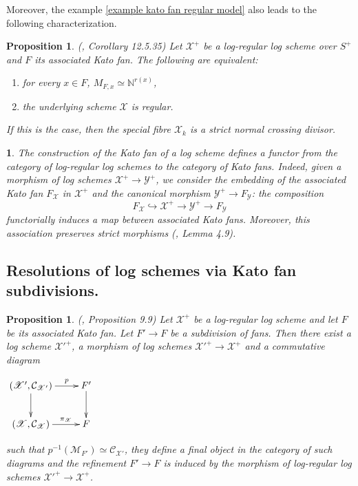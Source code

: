 \documentclass{amsart}%
\numberwithin{equation}{subsection}
\theoremstyle{plain2}
\newtheorem{prop}[equation]{Proposition}
\theoremstyle{definition2}
\theoremstyle{stepstyle}
\theoremstyle{point}
\theoremstyle{subpoint}
\newtheorem{subpoint}[equation]{}%
\newcommand{\spa}[1]{\begin{subpoint}#1\end{subpoint}}           %
\newcommand{\N}{\ensuremath{\mathbb{N}}}
\newcommand{\cX}{\ensuremath{\mathscr{X}}}
\newcommand{\caM}{\ensuremath{\mathcal{M}}}
\newcommand{\caC}{\ensuremath{\mathcal{C}}}
\newcommand{\cY}{\ensuremath{\mathscr{Y}}}
\renewcommand{\cY}{\ensuremath{\mathscr{Y}}}
\begin{document}
Moreover, the example \ref{example kato fan regular model} also leads to the following characterization.

\begin{prop} \label{resolution log scheme kato fan} (\cite{GabberRamero}, Corollary 12.5.35)
Let $\cX^+$ be a log-regular log scheme over $S^+$ and $F$ its associated Kato fan. The following are equivalent: \begin{enumerate}
\item for every $x \in F$, $M_{F,x} \simeq \N^{r(x)}$,
\item the underlying scheme $\cX$ is regular.
\end{enumerate}
If this is the case, then the special fibre $\cX_k$ is a strict normal crossing divisor.
\end{prop}
\spa{The construction of the Kato fan of a log scheme defines a functor from the category of log-regular log schemes to the category of Kato fans. Indeed, given a morphism of log schemes $\cX^+ \rightarrow \cY^+$, we consider the embedding of the associated Kato fan $F_{\cX}$ in $\cX^+$ and the canonical morphism $\cY^+ \rightarrow F_{\cY}$: the composition $$F_{\cX} \hookrightarrow \cX^+ \rightarrow \cY^+ \rightarrow F_\cY$$ functorially induces a map between associated Kato fans. Moreover, this association preserves strict morphisms (\cite{Ulirsch2013}, Lemma 4.9).}
\subsection{Resolutions of log schemes via Kato fan subdivisions.} \label{section resolution via kato subd}
\begin{prop} (\cite{Kato1994a}, Proposition 9.9) \label{prop morphism induced by subdivision kato fan}
Let $\cX^+$ be a log-regular log scheme and let $F$ be its associated Kato fan. Let $F' \rightarrow F$ be a subdivision of fans. Then there exist a log scheme ${\cX'}^+$, a morphism of log schemes ${\cX'}^+ \rightarrow \cX^+$ and a commutative diagram
\begin{center}
$\begin{gathered}
\xymatrixcolsep{2pc} \xymatrix{
  (\cX', \caC_{\cX'}) \ar[r]^-{p} \ar[d]^{} & F' \ar[d]^{}\\
  (\cX, \caC_{\cX}) \ar[r]^-{\pi_{\cX}}   & F
}
\end{gathered}$\end{center}such that $p^{-1}(\caM_{F'}) \simeq \caC_{\cX'}$, they define a final object in the category of such diagrams and the refinement $F'\to F$ is induced by the morphism of log-regular log schemes $\cX'^+ \rightarrow \cX^+$.
\end{prop}
\end{document}
